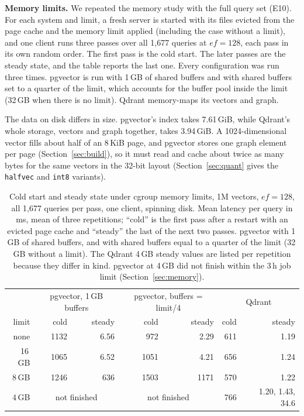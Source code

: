 \documentclass[preprint,12pt]{elsarticle}
\begin{document}
\textbf{Memory limits.} We repeated the memory study with the full query set (E10). For each
system and limit, a fresh server is started with its files evicted from the page cache and
the memory limit applied (including the case without a limit), and one client runs three
passes over all 1{,}677 queries at $ef=128$, each pass in its own random order. The first
pass is the cold start. The later passes are the steady state, and the table reports the
last one. Every configuration was run three times. pgvector is run with 1\,GB of shared
buffers and with shared buffers set to a quarter of the limit, which accounts for the
buffer pool inside the limit (32\,GB when there is no limit). Qdrant memory-maps its
vectors and graph.

The data on disk differs in size. pgvector's index takes 7.61\,GiB, while Qdrant's whole
storage, vectors and graph together, takes 3.94\,GiB. A 1024-dimensional vector fills about
half of an 8\,KiB page, and pgvector stores one graph element per page
(Section~\ref{sec:build}), so it must read and cache about twice as many bytes for the same
vectors in the 32-bit layout (Section~\ref{sec:quant} gives the \texttt{halfvec} and \texttt{int8} variants).

\begin{table}[t]
  \caption{Cold start and steady state under cgroup memory limits, 1M vectors, $ef=128$,
  all 1{,}677 queries per pass, one client, spinning disk. Mean latency per query in ms,
  mean of three repetitions; ``cold'' is the first pass after a restart with an evicted page
  cache and ``steady'' the last of the next two passes. pgvector with 1\,GB of shared
  buffers, and with shared buffers equal to a quarter of the limit (32\,GB without a limit).
  The Qdrant 4\,GB steady values are listed per repetition because they differ in kind.
  pgvector at 4\,GB did not finish within the 3\,h job limit (Section~\ref{sec:memory}).}
  \label{tab:caps}
  \small
  \begin{tabular}{r|rr|rr|rr}
    \toprule
     & \multicolumn{2}{c|}{pgvector, 1\,GB buffers} & \multicolumn{2}{c|}{pgvector, buffers = limit/4}
     & \multicolumn{2}{c}{Qdrant} \\
    limit & cold & steady & cold & steady & cold & steady \\
    \midrule
    none & 1132 & 6.56 & 972 & 2.29 & 611 & 1.19 \\
    16\,GB & 1065 & 6.52 & 1051 & 4.21 & 656 & 1.24 \\
    8\,GB & 1246 & 636 & 1503 & 1171 & 570 & 1.22 \\
    4\,GB & \multicolumn{2}{c|}{not finished} & \multicolumn{2}{c|}{not finished} & 766 & 1.20, 1.43, 34.6 \\
    \bottomrule
  \end{tabular}
\end{table}
\end{document}
